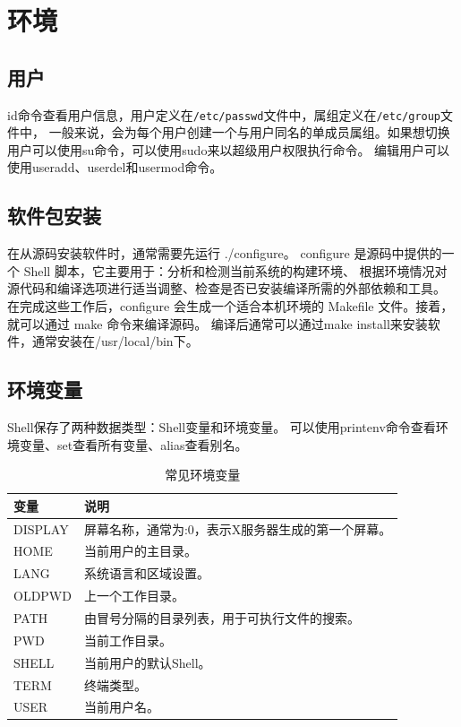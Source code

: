 \section{环境}
\subsection{用户}
id命令查看用户信息，用户定义在\texttt{/etc/passwd}文件中，属组定义在\texttt{/etc/group}文件中，
一般来说，会为每个用户创建一个与用户同名的单成员属组。如果想切换用户可以使用su命令，可以使用sudo来以超级用户权限执行命令。
编辑用户可以使用useradd、userdel和usermod命令。

\subsection{软件包安装}
在从源码安装软件时，通常需要先运行 ./configure。
configure 是源码中提供的一个 Shell 脚本，它主要用于：分析和检测当前系统的构建环境、
根据环境情况对源代码和编译选项进行适当调整、检查是否已安装编译所需的外部依赖和工具。
在完成这些工作后，configure 会生成一个适合本机环境的 Makefile 文件。接着，就可以通过 make 命令来编译源码。
编译后通常可以通过make install来安装软件，通常安装在/usr/local/bin下。

\subsection{环境变量}
Shell保存了两种数据类型：Shell变量和环境变量。
可以使用printenv命令查看环境变量、set查看所有变量、alias查看别名。
\begin{table}[H]
	\centering
	\begin{tabular}{|l|l|}
		\hline
		\textbf{变量} & \textbf{说明}                \\
		\hline
		DISPLAY     & 屏幕名称，通常为:0，表示X服务器生成的第一个屏幕。 \\
		\hline
		HOME        & 当前用户的主目录。                  \\
		\hline
		LANG        & 系统语言和区域设置。                 \\
		\hline
		OLDPWD      & 上一个工作目录。                   \\
		\hline
		PATH        & 由冒号分隔的目录列表，用于可执行文件的搜索。     \\
		\hline
		PWD         & 当前工作目录。                    \\
		\hline
		SHELL       & 当前用户的默认Shell。              \\
		\hline
		TERM        & 终端类型。                      \\
		\hline
		USER        & 当前用户名。                     \\
		\hline
	\end{tabular}
	\caption{常见环境变量}
\end{table}

